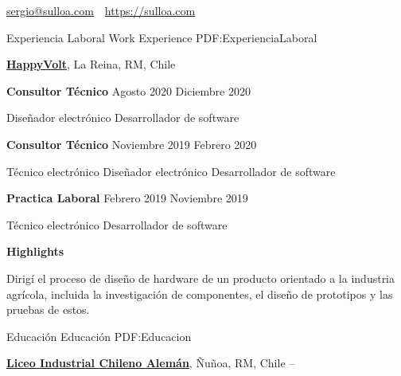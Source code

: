 \documentclass[letterpaper,yyyy,draft]{simpleresumecv}
\newcommand{\CVAuthor}{Sergio A. Ulloa B.}
\newcommand{\CVWebpage}{https://sulloa.com}
\begin{document}

\Title{\CVAuthor}

{
    \begin{SubTitle}
    \href{mailto:sergio@sulloa.com}{sergio@sulloa.com}
    \,\SubBulletSymbol\,
    \href{\CVWebpage}{\url{\CVWebpage}}
    \end{SubTitle}
}

\begin{Body}


\Section
{Experiencia\newline
Laboral}
{Work Experience}
{PDF:ExperienciaLaboral}
{
    \Entry
    \href{https://happyvolt.com/}{\textbf{HappyVolt}},
    La Reina, RM, Chile

    \BulletItem
    \textbf{Consultor Técnico}
    \hfill
    Agosto 2020
    Diciembre 2020
    \begin{Detail}
    \SubBulletItem
    Diseñador electrónico
    \SubBulletItem
    Desarrollador de software
    \end{Detail}

    \BigGap
    \BulletItem
    \textbf{Consultor Técnico}
    \hfill
    Noviembre 2019
    Febrero 2020
    \begin{Detail}
    \SubBulletItem
    Técnico electrónico
    \SubBulletItem
    Diseñador electrónico
    \SubBulletItem
    Desarrollador de software
    \end{Detail}

    \BigGap
    \BulletItem
    \textbf{Practica Laboral}
    \hfill
    Febrero 2019
    Noviembre 2019
    \begin{Detail}
    \SubBulletItem
    Técnico electrónico
    \SubBulletItem
    Desarrollador de software
    \end{Detail}

    \BigGap
    \BulletItem
    \textbf{Highlights}
    \hfill
    \begin{Detail}
    \SubBulletItem
    Dirigí el proceso de diseño de hardware de un producto orientado a la industria agrícola, incluida la investigación de componentes, el diseño de prototipos y las pruebas de estos.
    \end{Detail}
}


\Section
{Educación}
{Educación}
{PDF:Educacion}
{
    \Gap
    \Entry
    \href{https://www.lichan.cl/}{\textbf{Liceo Industrial Chileno Alemán}},
    Ñuñoa, RM, Chile
    \hfill
     -- 

}
\end{Body}
\end{document}

